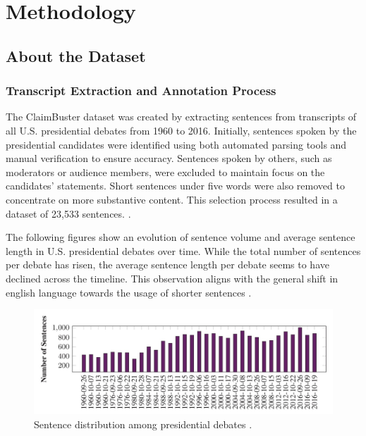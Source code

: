 \newpage
\section{Methodology}
\subsection{About the Dataset}


\subsubsection{Transcript Extraction and Annotation Process}

The ClaimBuster dataset was created by extracting sentences from transcripts of all U.S. presidential debates from 1960 to 2016. Initially, sentences spoken by the presidential candidates were identified using both automated parsing tools and manual verification to ensure accuracy. Sentences spoken by others, such as moderators or audience members, were excluded to maintain focus on the candidates' statements. Short sentences under five words were also removed to concentrate on more substantive content. This selection process resulted in a dataset of 23,533 sentences. \cite{claimbuster_arslan}. 

The following figures show an evolution of sentence volume and average sentence length in U.S. presidential debates over time. While the total number of sentences per debate has risen, the average sentence length per debate seems to have declined across the timeline. This observation aligns with the general shift in english language towards the usage of shorter sentences \cite{sentence_length_1}.

\begin{figure}[h]
    \centering
    \includegraphics[width=1\textwidth]{assets/Claimbuster_Number_of_Sentences.jpg}
    \caption{Sentence distribution among presidential debates \cite{claimbuster_arslan}.}
    \label{fig:my_label}
\end{figure}

